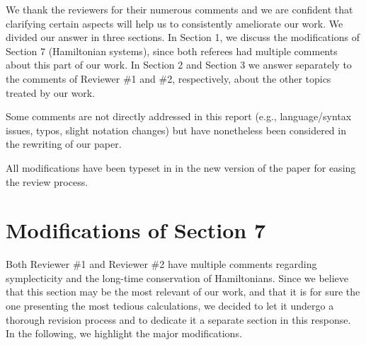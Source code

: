 \documentclass[10pt]{article}
\begin{document}
	\maketitle	

We thank the reviewers for their numerous comments and we are confident that clarifying certain aspects will help us to consistently ameliorate our work. We divided our answer in three sections. In Section 1, we discuss the modifications of Section 7 (Hamiltonian systems), since both referees had multiple comments about this part of our work. In Section 2 and Section 3 we answer separately to the comments of Reviewer \#1 and \#2, respectively, about the other topics treated by our work.

Some comments are not directly addressed in this report (e.g., language/syntax issues, typos, slight notation changes) but have nonetheless been considered in the rewriting of our paper.

All modifications have been typeset in  in the new version of the paper for easing the review process.

\section{Modifications of Section 7}

Both Reviewer \#1 and Reviewer \#2 have multiple comments regarding symplecticity and the long-time conservation of Hamiltonians. Since we believe that this section may be the most relevant of our work, and that it is for sure the one presenting the most tedious calculations, we decided to let it undergo a thorough revision process and to dedicate it a separate section in this response. In the following, we highlight the major modifications.
\end{document}
